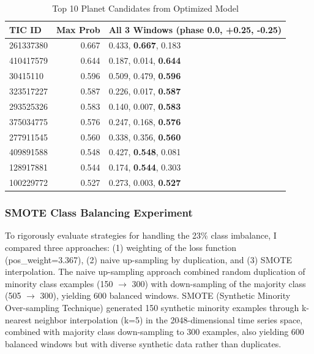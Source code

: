 \documentclass[letterpaper]{article} %
\begin{document}
\begin{table}[h]
    \centering
    \caption{Top 10 Planet Candidates from Optimized Model}
    \label{tab:top_candidates}
    \begin{tabular}{@{}lrp{3.2cm}@{}}
        \toprule
        \textbf{TIC ID} & \textbf{Max Prob} & \textbf{All 3 Windows (phase 0.0, +0.25, -0.25)} \\
        \midrule
            261337380 & 0.667 & 0.433, \textbf{0.667}, 0.183 \\
            410417579 & 0.644 & 0.187, 0.014, \textbf{0.644} \\
            30415110 & 0.596 & 0.509, 0.479, \textbf{0.596} \\
            323517227 & 0.587 & 0.226, 0.017, \textbf{0.587} \\
            293525326 & 0.583 & 0.140, 0.007, \textbf{0.583} \\
            375034775 & 0.576 & 0.247, 0.168, \textbf{0.576} \\
            277911545 & 0.560 & 0.338, 0.356, \textbf{0.560} \\
            409891588 & 0.548 & 0.427, \textbf{0.548}, 0.081 \\
            128917881 & 0.544 & 0.174, \textbf{0.544}, 0.303 \\
            100229772 & 0.527 & 0.273, 0.003, \textbf{0.527} \\
        \bottomrule
    \end{tabular}
\end{table}

\subsubsection{SMOTE Class Balancing Experiment}

To rigorously evaluate strategies for handling the 23\% class imbalance, I compared three approaches: (1) weighting of the loss function (pos\_weight=3.367), (2) naive up-sampling by duplication, and (3) SMOTE interpolation. The naive up-sampling approach combined random duplication of minority class examples (150 $\rightarrow$ 300) with down-sampling of the majority class (505 $\rightarrow$ 300), yielding 600 balanced windows. SMOTE (Synthetic Minority Over-sampling Technique) generated 150 synthetic minority examples through k-nearest neighbor interpolation (k=5) in the 2048-dimensional time series space, combined with majority class down-sampling to 300 examples, also yielding 600 balanced windows but with diverse synthetic data rather than duplicates.
\end{document}
